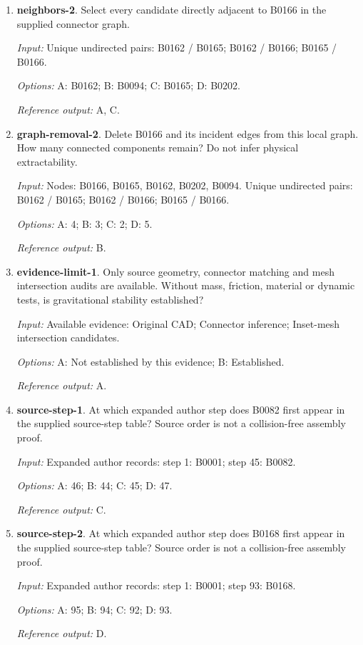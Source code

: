 \begin{enumerate}
\item \textbf{neighbors-2}. Select every candidate directly adjacent to B0166 in the supplied connector graph.\par {\small \textit{Input:} Unique undirected pairs: B0162 / B0165; B0162 / B0166; B0165 / B0166. \par\textit{Options:} A: B0162; B: B0094; C: B0165; D: B0202. \par\textit{Reference output:} A, C.}
\item \textbf{graph-removal-2}. Delete B0166 and its incident edges from this local graph. How many connected components remain? Do not infer physical extractability.\par {\small \textit{Input:} Nodes: B0166, B0165, B0162, B0202, B0094. Unique undirected pairs: B0162 / B0165; B0162 / B0166; B0165 / B0166. \par\textit{Options:} A: 4; B: 3; C: 2; D: 5. \par\textit{Reference output:} B.}
\item \textbf{evidence-limit-1}. Only source geometry, connector matching and mesh intersection audits are available. Without mass, friction, material or dynamic tests, is gravitational stability established?\par {\small \textit{Input:} Available evidence: Original CAD; Connector inference; Inset-mesh intersection candidates. \par\textit{Options:} A: Not established by this evidence; B: Established. \par\textit{Reference output:} A.}
\item \textbf{source-step-1}. At which expanded author step does B0082 first appear in the supplied source-step table? Source order is not a collision-free assembly proof.\par {\small \textit{Input:} Expanded author records: step 1: B0001; step 45: B0082. \par\textit{Options:} A: 46; B: 44; C: 45; D: 47. \par\textit{Reference output:} C.}
\item \textbf{source-step-2}. At which expanded author step does B0168 first appear in the supplied source-step table? Source order is not a collision-free assembly proof.\par {\small \textit{Input:} Expanded author records: step 1: B0001; step 93: B0168. \par\textit{Options:} A: 95; B: 94; C: 92; D: 93. \par\textit{Reference output:} D.}

\end{enumerate}
